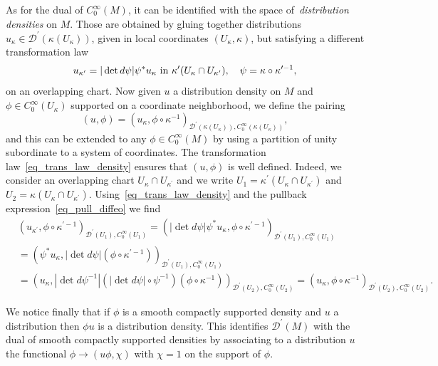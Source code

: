 \documentclass[12pt,reqno]{amsart}
\numberwithin{equation}{section}
\theoremstyle{definition}
\theoremstyle{plain}
\theoremstyle{definition}
\theoremstyle{definition}
\begin{document}
As for the dual of $C^\infty_0(M)$, it can be identified with the space of~\textit{distribution densities} on $M$. Those are obtained by gluing together distributions $u_\kappa \in \mathcal{D}^\prime (\kappa(U_\kappa))$, given in local coordinates $(U_\kappa, \kappa )$, but satisfying a different transformation law
\begin{equation}
\label{eq_trans_law_density}
    u_{\kappa^\prime}=|\det d \psi| \psi ^* u_\kappa \textnormal{ in } \kappa^\prime(U_\kappa \cap U_{\kappa^\prime}), \quad \psi=\kappa \circ \kappa^{\prime -1},
\end{equation}
on an overlapping chart. Now given $u$ a distribution density on $M$ and $\phi \in C^\infty_0 (U_\kappa)$ supported on a coordinate neighborhood, we define the pairing
\begin{equation}
    (u, \phi)=(u_\kappa, \phi \circ \kappa^{-1})_{\mathcal{D}^\prime(\kappa(U_\kappa)), C^\infty_0 (\kappa(U_\kappa))},
\end{equation}
and this can be extended to any $\phi \in C^\infty_0(M)$ by using a partition of unity subordinate to a system of coordinates.  The transformation law~\eqref{eq_trans_law_density} ensures that $(u, \phi)$ is well defined. Indeed, we consider an overlapping chart $U_\kappa \cap U_{\kappa^\prime}$ and we write $U_1=\kappa^\prime (U_\kappa \cap U_{\kappa^\prime})$ and $U_2=\kappa (U_\kappa \cap U_{\kappa^\prime})$. Using~\eqref{eq_trans_law_density} and the pullback expression~\eqref{eq_pull_diffeo} we find
\begin{align}
    &(u_{\kappa^\prime}, \phi \circ \kappa^{\prime -1})_{\mathcal{D}^\prime(U_1), C^\infty_0 (U_1)}=(|\det d \psi| \psi ^* u_\kappa,\phi \circ \kappa^{\prime -1} )_{\mathcal{D}^\prime(U_1), C^\infty_0 (U_1)} \\
    &=( \psi ^* u_\kappa,|\det d \psi| (\phi \circ \kappa^{\prime -1} ))_{\mathcal{D}^\prime(U_1), C^\infty_0 (U_1)}\\&
    =( u_\kappa,|\det d \psi^{-1}| ( |\det d \psi| \circ \psi^{-1} )(\phi \circ \kappa^{ -1} ))_{\mathcal{D}^\prime(U_2), C^\infty_0 (U_2)} =(u_{\kappa}, \phi \circ \kappa^{-1})_{\mathcal{D}^\prime(U_2), C^\infty_0 (U_2)}.
\end{align}

We notice finally that if $\phi$ is a smooth compactly supported density and $u$ a distribution then $\phi u$ is a distribution density.  This identifies $\mathcal{D}^\prime (M)$ with the dual of smooth compactly supported densities by associating to a distribution $u$ the functional $\phi \to (u \phi, \chi )$ with $\chi=1$ on the support of $\phi$.
\end{document}
